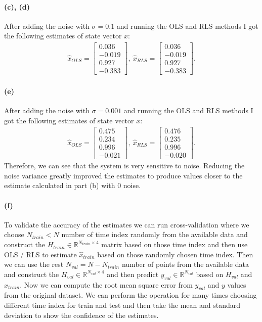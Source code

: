 \paragraph{(c), (d)}After adding the noise with $\sigma = 0.1$ and running the OLS and RLS methods I got the following estimates of state vector $x$:
\begin{align}
	\hat{x}_{OLS} = \begin{bmatrix}0.036\\-0.019\\0.927\\-0.383\end{bmatrix},\ \hat{x}_{RLS} = \begin{bmatrix}0.036\\-0.019\\0.927\\-0.383\end{bmatrix}.
\end{align}
\paragraph{(e)}After adding the noise with $\sigma = 0.001$ and running the OLS and RLS methods I got the following estimates of state vector $x$:
\begin{align}
\hat{x}_{OLS} = \begin{bmatrix}0.475\\0.234\\0.996\\-0.021\end{bmatrix},\ \hat{x}_{RLS} = \begin{bmatrix}0.476\\0.235\\0.996\\-0.020\end{bmatrix}.
\end{align}
Therefore, we can see that the system is very sensitive to noise. Reducing the noise variance greatly improved the estimates to produce values closer to the estimate calculated in part (b) with $0$ noise.
\paragraph{(f)} To validate the accuracy of the estimates we can run cross-validation where we choose $N_{train} < N$ number of time index randomly from the available data and construct the $H_{train} \in \mathbb{R}^{N_{train}\times 4}$ matrix based on those time index and then use OLS / RLS to estimate $\hat{x}_{train}$ based on those randomly chosen time index. Then we can use the rest $N_{val} = N-N_{train}$ number of points from the available data and construct the $H_{val} \in \mathbb{R}^{N_{val}\times 4}$ and then predict $y_{val} \in \mathbb{R}^{N_{val}}$ based on $H_{val}$ and $\hat{x}_{train}$. Now we can compute the root mean square error from $y_{val}$ and $y$ values from the original dataset. We can perform the operation for many times choosing different time index for train and test and then take the mean and standard deviation to show the confidence of the estimates.

